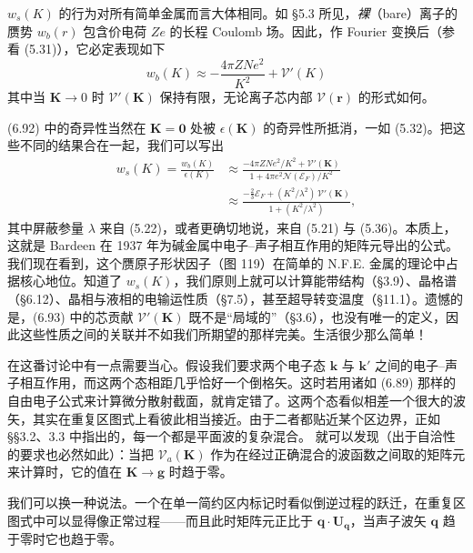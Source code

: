 $w_{s}(K)$ 的行为对所有简单金属而言大体相同。如 §5.3 所见，\emph{裸}（bare）离子的赝势 $w_{b}(r)$ 包含价电荷 $Ze$ 的长程 Coulomb 场。因此，作 Fourier 变换后（参看 (5.31)），它必定表现如下
\begin{equation*}
w_{b}(K) \approx -\frac{4\pi ZNe^{2}}{K^{2}} + \mathcal{V}'(K) \tag{6.92}
\end{equation*}
其中当 $\mathbf{K} \rightarrow 0$ 时 $\mathcal{V}'(\mathbf{K})$ 保持有限，无论离子芯内部 $\mathcal{V}(\mathbf{r})$ 的形式如何。

(6.92) 中的奇异性当然在 $\mathbf{K} = \mathbf{0}$ 处被 $\epsilon(\mathbf{K})$ 的奇异性所抵消，一如 (5.32)。把这些不同的结果合在一起，我们可以写出
\begin{align*}
w_{s}(K) = \frac{w_{b}(K)}{\epsilon(K)} &\approx \frac{-4\pi ZNe^{2}/K^{2} + \mathcal{V}'(\mathbf{K})}{1 + 4\pi e^{2}\mathcal{N}(\mathcal{E}_{F})/K^{2}} \\
&\approx \frac{-\frac{2}{3}\mathcal{E}_{F} + (K^{2}/\lambda^{2})\,\mathcal{V}'(\mathbf{K})}{1 + (K^{2}/\lambda^{2})}, \tag{6.93}
\end{align*}
其中屏蔽参量 $\lambda$ 来自 (5.22)，或者更确切地说，来自 (5.21) 与 (5.36)。本质上，这就是 Bardeen 在 1937 年为碱金属中电子--声子相互作用的矩阵元导出的公式。我们现在看到，这个赝原子形状因子（图 119）在简单的
N.F.E. 金属的理论中占据核心地位。知道了 $w_{s}(K)$，我们原则上就可以计算能带结构（§3.9）、晶格谱（§6.12）、晶相与液相的电输运性质（§7.5），甚至超导转变温度（§11.1）。遗憾的是，(6.93) 中的芯贡献 $\mathcal{V}'(\mathbf{K})$ 既不是“局域的”（§3.6），也没有唯一的定义，因此这些性质之间的关联并不如我们所期望的那样完美。生活很少那么简单！



在这番讨论中有一点需要当心。假设我们要求两个电子态 $\mathbf{k}$ 与 $\mathbf{k}'$ 之间的电子--声子相互作用，而这两个态相距几乎恰好一个倒格矢。这时若用诸如 (6.89) 那样的自由电子公式来计算微分散射截面，就肯定错了。这两个态看似相差一个很大的波矢，其实在重复区图式上看彼此相当接近。由于二者都贴近某个区边界，正如 §§3.2、3.3 中指出的，每一个都是平面波的复杂混合。
就可以发现（出于自洽性的要求也必然如此）：当把 $\mathcal{V}_{a}(\mathbf{K})$ 作为在经过正确混合的波函数之间取的矩阵元来计算时，它的值在 $\mathbf{K} \rightarrow \mathbf{g}$ 时趋于零。

我们可以换一种说法。一个在单一简约区内标记时看似倒逆过程的跃迁，在重复区图式中可以显得像正常过程——而且此时矩阵元正比于 $\mathbf{q}\cdot\mathbf{U}_{\mathbf{q}}$，当声子波矢 $\mathbf{q}$ 趋于零时它也趋于零。

